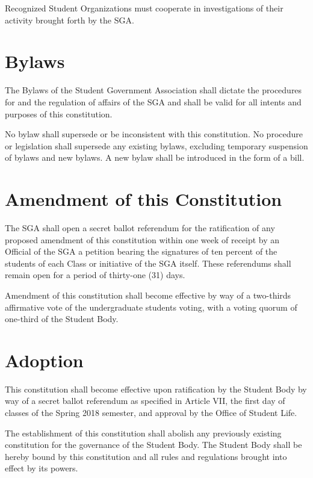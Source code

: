 \documentclass[12pt,oneside]{scrreprt}
\begin{document}
Recognized Student Organizations must cooperate in investigations of their activity
brought forth by the SGA.

\chapter{Bylaws}
The Bylaws of the Student Government Association shall dictate the procedures for and the regulation of affairs of the SGA and shall be valid for all intents and purposes of this constitution.

No bylaw shall supersede or be inconsistent with this constitution. No procedure or legislation shall supersede any existing bylaws, excluding temporary suspension of bylaws and new bylaws. A new bylaw shall be introduced in the form of a bill.

\chapter{Amendment of this Constitution}
The SGA shall open a secret ballot referendum for the ratification of any proposed amendment of this constitution within one week of receipt by an Official of the SGA a petition bearing the signatures of ten percent of the students of each Class or initiative of the SGA itself. These referendums shall remain open for a period of thirty-one (31) days.

Amendment of this constitution shall become effective by way of a two-thirds affirmative
vote of the undergraduate students voting, with a voting quorum of one-third of the Student Body.

\chapter{Adoption}
This constitution shall become effective upon ratification by the Student Body by way of a secret ballot referendum as specified in Article VII, the first day of classes of the Spring 2018 semester, and approval by the Office of Student Life.

The establishment of this constitution shall abolish any previously existing constitution for the governance of the Student Body. The Student Body shall be hereby bound by this constitution and all rules and regulations brought into effect by its powers.
\end{document}
